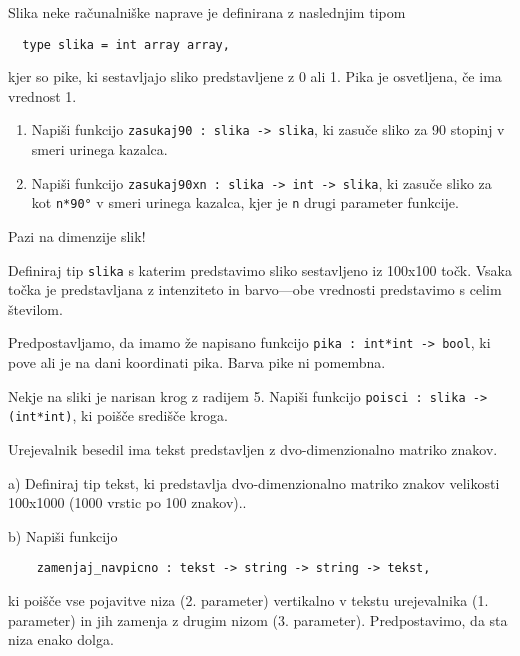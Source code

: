 \begin{ex}
  Slika neke ra\v cunalni\v ske naprave je definirana z naslednjim
  tipom

  \begin{lstlisting}
  type slika = int array array,
  \end{lstlisting}
  kjer so pike, ki sestavljajo sliko predstavljene z 0 ali 1. Pika je
  osvetljena, \v ce ima vrednost 1.

  \begin{enumerate}[label=(\roman*)]
  \item Napi\v si funkcijo \lstinline{zasukaj90 : slika -> slika}, ki
    zasu\v ce sliko za 90 stopinj v smeri urinega kazalca.

  \item Napi\v si funkcijo 
  \lstinline{zasukaj90xn : slika -> int -> slika}, 
  ki zasu\v ce sliko za kot \lstinline{n*90°} v smeri urinega
    kazalca, kjer je \lstinline{n} drugi parameter funkcije.
  \end{enumerate}

  Pazi na dimenzije slik!


\end{ex} 
\begin{ex}
  Definiraj tip \lstinline{slika} s katerim predstavimo sliko sestavljeno
  iz 100x100 to\v ck. Vsaka to\v cka je predstavljana z intenziteto in
  barvo---obe vrednosti predstavimo s celim \v stevilom.

  Predpostavljamo, da imamo \v ze napisano funkcijo \lstinline{pika : int*int -> bool}, 
  ki pove ali je na dani koordinati pika. Barva
  pike ni pomembna.

  Nekje na sliki je narisan krog z radijem 5. Napi\v si funkcijo
  \lstinline{poisci : slika -> (int*int)}, ki poi\v s\v ce sredi\v s\v ce
  kroga.


\end{ex} 
\begin{ex}
  Urejevalnik besedil ima tekst predstavljen z dvo-dimenzionalno
  matriko znakov.

  a) Definiraj tip tekst, ki predstavlja dvo-dimenzionalno matriko
  znakov velikosti 100x1000 (1000 vrstic po 100 znakov)..

  b) Napi\v si funkcijo

\begin{lstlisting}
    zamenjaj_navpicno : tekst -> string -> string -> tekst, 
\end{lstlisting}
  ki poi\v s\v ce vse pojavitve niza (2. parameter) vertikalno v
  tekstu urejevalnika (1. parameter) in jih zamenja z drugim nizom
  (3. parameter). Predpostavimo, da sta niza enako dolga.


\end{ex} 
